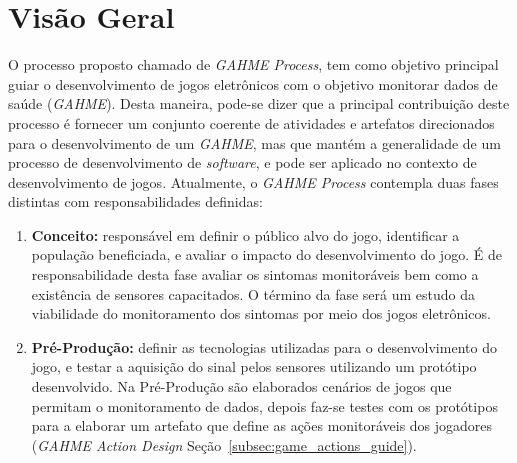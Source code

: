 \section{Visão Geral}
O processo proposto chamado de \textit{GAHME Process}, tem como objetivo principal guiar o desenvolvimento de jogos eletrônicos com o objetivo monitorar dados de saúde (\textit{GAHME}). Desta maneira, pode-se dizer que a principal contribuição deste processo é fornecer um conjunto coerente de atividades e artefatos direcionados para o desenvolvimento de um \textit{GAHME}, mas que mantém a generalidade de um processo de desenvolvimento de \textit{software}, e pode ser aplicado no contexto de desenvolvimento de jogos.
%
%
Atualmente, o \textit{GAHME Process} contempla duas fases distintas com responsabilidades definidas:
	
	\begin{enumerate}
	\item \textbf{Conceito:} responsável em definir o público alvo do jogo, identificar a população beneficiada, e avaliar o impacto do desenvolvimento do jogo. É de responsabilidade desta fase avaliar os sintomas monitoráveis bem como a existência de sensores capacitados. O término da fase será um estudo da viabilidade do monitoramento dos sintomas por meio dos jogos eletrônicos.
	\item \textbf{Pré-Produção:} definir as tecnologias utilizadas para o desenvolvimento do jogo, e testar a aquisição do sinal pelos sensores utilizando um protótipo desenvolvido. 
	Na Pré-Produção são elaborados cenários de jogos que permitam o monitoramento de dados, depois faz-se testes com os protótipos para a elaborar um artefato que define as ações monitoráveis dos jogadores (\textit{GAHME Action Design} Seção~\ref{subsec:game_actions_guide}).
\end{enumerate}

